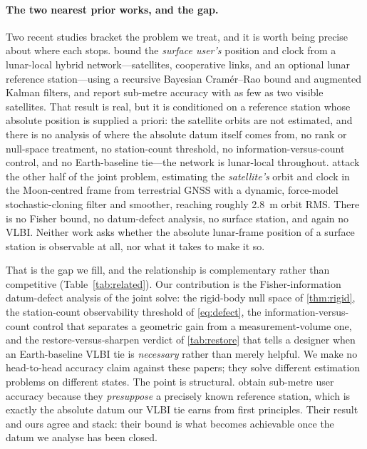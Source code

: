 \paragraph{The two nearest prior works, and the gap.}
Two recent studies bracket the problem we treat, and it is worth being precise
about where each stops. \citet{pohlmann2025hybrid} bound the \emph{surface user's}
position and clock from a lunar-local hybrid network---satellites, cooperative
links, and an optional lunar reference station---using a recursive Bayesian
Cram\'er--Rao bound and augmented Kalman filters, and report sub-metre accuracy
with as few as two visible satellites. That result is real, but it is conditioned
on a reference station whose absolute position is supplied a priori: the
satellite orbits are not estimated, and there is no analysis of where the absolute
datum itself comes from, no rank or null-space treatment, no station-count
threshold, no information-versus-count control, and no Earth-baseline tie---the
network is lunar-local throughout. \citet{iiyama2026odclock} attack the other half
of the joint problem, estimating the \emph{satellite's} orbit and clock in the
Moon-centred frame from terrestrial GNSS with a dynamic, force-model
stochastic-cloning filter and smoother, reaching roughly \SI{2.8}{\meter} orbit
RMS. There is no Fisher bound, no datum-defect analysis, no surface station, and
again no VLBI. Neither work asks whether the absolute lunar-frame position of a
surface station is observable at all, nor what it takes to make it so.

That is the gap we fill, and the relationship is complementary rather than
competitive (Table~\ref{tab:related}). Our contribution is the
Fisher-information datum-defect analysis of the joint solve: the rigid-body null
space of \ref{thm:rigid}, the station-count observability threshold of
\eqref{eq:defect}, the information-versus-count control that separates a geometric
gain from a measurement-volume one, and the restore-versus-sharpen verdict of
\ref{tab:restore} that tells a designer when an Earth-baseline VLBI tie is
\emph{necessary} rather than merely helpful. We make no head-to-head accuracy
claim against these papers; they solve different estimation problems on different
states. The point is structural. \citet{pohlmann2025hybrid} obtain sub-metre user
accuracy because they \emph{presuppose} a precisely known reference station, which
is exactly the absolute datum our VLBI tie earns from first principles. Their
result and ours agree and stack: their bound is what becomes achievable once the
datum we analyse has been closed.

